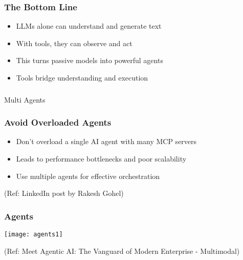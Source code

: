 \begin{frame}[fragile]\frametitle{The Bottom Line}
      \begin{itemize}
        \item LLMs alone can understand and generate text
        \item With tools, they can observe and act
        \item This turns passive models into powerful agents
        \item Tools bridge understanding and execution
      \end{itemize}
\end{frame}



\begin{frame}[fragile]\frametitle{}
\begin{center}
{\Large Multi Agents}
\end{center}
\end{frame}


\begin{frame}[fragile]\frametitle{Avoid Overloaded Agents}
    \begin{itemize}
        \item Don't overload a single AI agent with many MCP servers
        \item Leads to performance bottlenecks and poor scalability
        \item Use multiple agents for effective orchestration
    \end{itemize}
	
{\tiny (Ref: LinkedIn post by Rakesh Gohel)}
	
\end{frame}

\begin{frame}[fragile]\frametitle{Agents}
	
	\begin{center}
	\texttt{[image: agents1]}
	\end{center}
	
{\tiny (Ref: Meet Agentic AI: The Vanguard of Modern Enterprise - Multimodal)}

\end{frame}


